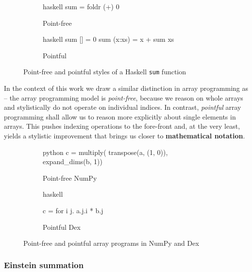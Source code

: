 \begin{figure}[h]
\centering
\begin{subfigure}{.3\textwidth}
  \centering
    \begin{cminted}{haskell}
sum = foldr (+) 0
    \end{cminted}
      \caption{Point-free}
\end{subfigure}%
\begin{subfigure}{.3\textwidth}
  \centering
  \begin{cminted}{haskell}
sum [] = 0
sum (x:xs) = x + sum xs
  \end{cminted}
  \caption{Pointful}
\end{subfigure}
\caption{Point-free and pointful styles of a Haskell \texttt{sum} function}
\label{fig:point-haskell}
\end{figure}

In the context of this work we draw a similar distinction in array programming as \textcite{paszke2021getting} -- the array programming model is \textit{point-free}, because we reason on whole arrays and stylistically do not operate on individual indices. In contrast, \textit{pointful} array programming shall allow us to reason more explicitly about single elements in arrays. This pushes indexing operations to the fore-front and, at the very least, yields a stylistic 
improvement that brings us closer to \textbf{mathematical 
notation}.

\begin{figure}[h]
\centering
\begin{subfigure}{.4\textwidth}
  \centering
    \begin{cminted}{python}
c = multiply(
  transpose(a, (1, 0)),
  expand_dims(b, 1))
    \end{cminted}
      \caption{Point-free NumPy}
\end{subfigure}%
\begin{subfigure}{.4\textwidth}
  \centering
  \begin{cminted}{haskell}

c = for i j. a.j.i * b.j
  
  \end{cminted}
  \caption{Pointful Dex}
\end{subfigure}
\caption{Point-free and pointful array programs in NumPy and Dex}
\label{fig:point-arrays}
\end{figure}


\subsubsection{Einstein summation}

